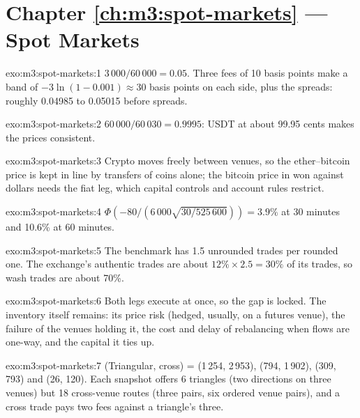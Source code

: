 \section*{Chapter \ref{ch:m3:spot-markets} --- Spot Markets}

\begin{solution}{exo:m3:spot-markets:1}
$3\,000/60\,000 = 0.05$. Three fees of 10 basis points make a band of $-3\ln(1 - 0.001) \approx 30$ basis
points on each side, plus the spreads: roughly 0.04985 to 0.05015 before spreads.
\end{solution}

\begin{solution}{exo:m3:spot-markets:2}
$60\,000/60\,030 = 0.9995$: USDT at about 99.95 cents makes the prices consistent.
\end{solution}

\begin{solution}{exo:m3:spot-markets:3}
Crypto moves freely between venues, so the ether--bitcoin price is kept in line by transfers of coins alone; the
bitcoin price in won against dollars needs the fiat leg, which capital controls and account rules restrict.
\end{solution}

\begin{solution}{exo:m3:spot-markets:4}
$\Phi(-80/(6\,000\sqrt{30/525\,600})) = 3.9\%$ at 30 minutes and 10.6\% at 60 minutes.
\end{solution}

\begin{solution}{exo:m3:spot-markets:5}
The benchmark has 1.5 unrounded trades per rounded one. The exchange's authentic trades are about $12\% \times 2.5 =
30\%$ of its trades, so wash trades are about 70\%.
\end{solution}

\begin{solution}{exo:m3:spot-markets:6}
Both legs execute at once, so the gap is locked. The inventory itself remains: its price risk (hedged, usually, on
a futures venue), the failure of the venues holding it, the cost and delay of rebalancing when flows are one-way,
and the capital it ties up.
\end{solution}

\begin{solution}{exo:m3:spot-markets:7}
(Triangular, cross) = (1\,254, 2\,953), (794, 1\,902), (309, 793) and (26, 120). Each snapshot offers 6
triangles (two directions on three venues) but 18 cross-venue routes (three pairs, six ordered venue pairs), and a
cross trade pays two fees against a triangle's three.
\end{solution}

